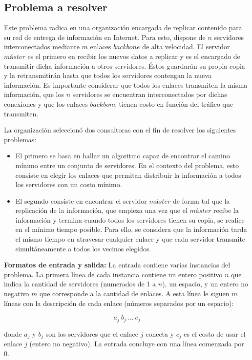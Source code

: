 \subsection{Problema a resolver}
Este problema radica en una organización encargada de replicar contenido para su red de entrega de información en Internet. Para esto, dispone de $n$ servidores interconectados mediante $m$ enlaces $backbone$ de alta velocidad. El servidor $máster$ es el primero en recibir los nuevos datos a replicar y es el encargado de transmitir dicha información a otros servidores. Éstos guardarán su propia copia y la retransmitirán hasta que todos los servidores contengan la nueva información. Es importante considerar que todos los enlaces transmiten la misma información, que los $n$ servidores se encuentran interconectados por dichas conexiones y que los enlaces $backbone$ tienen costo en función del tráfico que transmiten.

La organización seleccionó dos consultoras con el fin de resolver los siguientes problemas:
\begin{itemize}
\item El primero se basa en hallar un algoritmo capaz de encontrar el camino mínimo entre un conjunto de servidores. En el contexto del problema, esto consiste en elegir los enlaces que permitan distribuir la información a todos los servidores con un costo mínimo.

\item El segundo consiste en encontrar el servidor $máster$ de forma tal que la replicación de la información, que empieza una vez que el $máster$ recibe la información y termina cuando todos los servidores tienen su copia, se realice en el mínimo tiempo posible. Para ello, se considera que la información tarda el mismo tiempo en atravesar cualquier enlace y que cada servidor transmite simultáneamente a todos los vecinos elegidos.
\end{itemize}
\textbf {Formatos de entrada y salida:}\newline
\newline
La entrada contiene varias instancias del problema. La primera línea de cada instancia contiene un entero positivo $n$ que indica la cantidad de servidores (numerados de 1 a $n$), un espacio, y un entero no negativo $m$ que corresponde a la cantidad de enlaces. A esta línea le siguen $m$ líneas con la descripción de cada enlace (números separados por un espacio):

$$a_{j}\ b_{j}\ ...\ c_{j}$$


donde \textbf{$a_{j}$} y \textbf{$b_{j}$} son los servidores que el enlace $j$ conecta y \textbf{$c_{j}$} es el costo de usar el enlace $j$ (entero no negativo). La entrada concluye con una línea comenzada por 0.\newline


